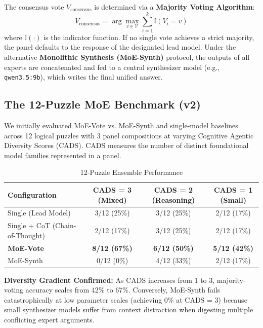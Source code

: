\documentclass[11pt,a4paper]{article}
\begin{document}
The consensus vote $V_{\text{consensus}}$ is determined via a \textbf{Majority Voting Algorithm}:
\begin{equation}
    V_{\text{consensus}} = \arg\max_{v \in \mathcal{V}} \sum_{i=1}^k \mathbb{I}(V_i = v)
\end{equation}
where $\mathbb{I}(\cdot)$ is the indicator function. If no single vote achieves a strict majority, the panel defaults to the response of the designated lead model. Under the alternative \textbf{Monolithic Synthesis (MoE-Synth)} protocol, the outputs of all experts are concatenated and fed to a central synthesizer model (e.g., \texttt{qwen3.5:9b}), which writes the final unified answer.

\subsection{The 12-Puzzle MoE Benchmark (v2)}

We initially evaluated MoE-Vote vs. MoE-Synth and single-model baselines across 12 logical puzzles with 3 panel compositions at varying Cognitive Agentic Diversity Scores (CADS). CADS measures the number of distinct foundational model families represented in a panel.

\begin{table}[ht]
\centering
\footnotesize
\setlength{\tabcolsep}{3pt}
\caption{12-Puzzle Ensemble Performance}
\label{tab:12_puzzle}
\begin{tabular}{>{\raggedright\arraybackslash}p{4.2cm}ccc}
\toprule
\textbf{Configuration} & \textbf{CADS = 3 (Mixed)} & \textbf{CADS = 2 (Reasoning)} & \textbf{CADS = 1 (Small)} \\
\midrule
Single (Lead Model) & 3/12 (25\%) & 3/12 (25\%) & 2/12 (17\%) \\
Single + CoT (Chain-of-Thought) & 2/12 (17\%) & 3/12 (25\%) & 2/12 (17\%) \\
\textbf{MoE-Vote} & \textbf{8/12 (67\%)} & \textbf{6/12 (50\%)} & \textbf{5/12 (42\%)} \\
MoE-Synth & 0/12 (0\%) & 4/12 (33\%) & 2/12 (17\%) \\
\bottomrule
\end{tabular}
\end{table}

\textbf{Diversity Gradient Confirmed:} As CADS increases from 1 to 3, majority-voting accuracy scales from 42\% to 67\%. Conversely, MoE-Synth fails catastrophically at low parameter scales (achieving 0\% at CADS = 3) because small synthesizer models suffer from context distraction when digesting multiple conflicting expert arguments.
\end{document}
